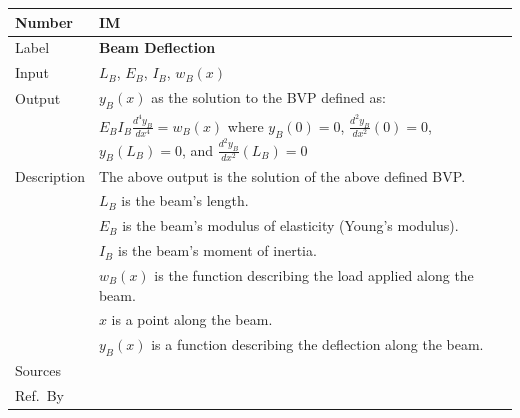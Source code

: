 \documentclass[12pt]{article}
\newcommand{\colAwidth}{0.13\textwidth}
\newcommand{\colBwidth}{0.82\textwidth}
\newcounter{instnum} %
\begin{document}

\noindent
\begin{minipage}{\textwidth}
    \renewcommand*{\arraystretch}{1.5}
    \begin{tabular}{| p{\colAwidth} | p{\colBwidth}|}
        \hline
        \rowcolor[gray]{0.9}
        Number      & IM{instnum}\theinstnum{}\label{im_deflection}           \\ \hline
        Label       & \bf Beam Deflection                                                    \\ \hline
        Input       & $L_B$, $E_B$, $I_B$, $w_{B}(x)$                                        \\ \hline
        Output      & \(y_{B}(x)\) as the solution to the BVP defined as:                    \\
                    & \(E_{B}I_{B}\frac{d^{4}y_{B}}{dx^{4}}=w_{B}(x)\) where \(y_{B}(0)=0\),
        \(\frac{d^{2}y_{B}}{dx^{2}}(0)=0\), \(y_{B}(L_B)=0\), and
        \(\frac{d^{2}y_{B}}{dx^{2}}(L_B)=0\)                                                 \\ \hline
        Description & The above output is the solution of the above defined BVP.             \\
                    & $L_B$ is the beam's length.                                            \\
                    & $E_B$ is the beam's modulus of elasticity (Young's modulus).           \\
                    & $I_B$ is the beam's moment of inertia.                                 \\
                    & $w_{B}(x)$ is the function describing the load applied along the beam. \\
                    & $x$ is a point along the beam.                                         \\
                    & $y_{B}(x)$ is a function describing the deflection along the beam.     \\ \hline
        Sources     & \textemdash{}                                                          \\ \hline
        Ref.\ By    & \textemdash{}                                                          \\ \hline
    \end{tabular}
\end{minipage}\\
\end{document}
